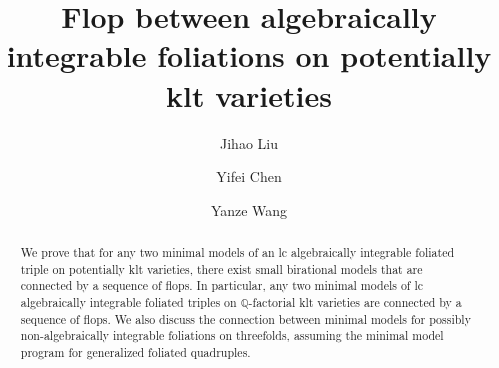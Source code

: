 \documentclass[preprint,12pt]{elsarticle}
\newcommand{\Qq}{\mathbb{Q}}
\begin{document}
\begin{frontmatter}



\title{Flop between algebraically integrable foliations on potentially klt varieties}


\author[inst1]{Jihao Liu}

\author[inst2]{Yifei Chen}
\author[inst2]{Yanze Wang}

\begin{abstract}
We prove that for any two minimal models of an lc algebraically integrable foliated triple on potentially klt varieties, there exist small birational models that are connected by a sequence of flops. In particular, any two minimal models of lc algebraically integrable foliated triples on $\Qq$-factorial klt varieties are connected by a sequence of flops. We also discuss the connection between minimal models for possibly non-algebraically integrable foliations on threefolds, assuming the minimal model program for generalized foliated quadruples.
\end{abstract}


\end{frontmatter}
\end{document}
